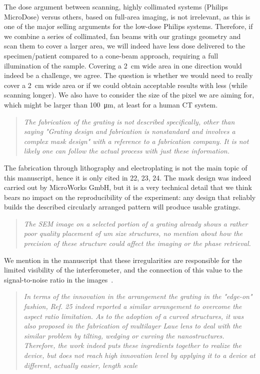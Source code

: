 \documentclass[a4paper,english]{scrartcl}
\newenvironment{reviewerquote}{\begin{quote}\itshape}{\end{quote}}
\begin{document}
The dose argument between scanning, highly collimated systems
(Philips MicroDose) versus others, based on full-area imaging, is not
irrelevant, as this is one of the major selling arguments for the low-dose
Philips systems. Therefore, if we combine a series of collimated, fan beams
with our gratings geometry and scan them to cover a larger area, we will
indeed have less dose delivered to the specimen/patient compared to a
cone-beam approach, requiring a full illumination of the sample. Covering a
\SI{2}{\centi\meter} wide area in one direction would indeed be a challenge, we agree. The
question is whether we would need to really cover a \SI{2}{\centi\meter} wide area or if we
could obtain acceptable results with less (while scanning longer). We also
have to consider the size of the pixel we are aiming for, which might be
larger than \SI{100}{\micro\meter}, at least for a human CT system.

\begin{reviewerquote}
The fabrication of the grating is not described specifically,
other than saying "Grating design and fabrication is nonstandard and
involves a complex mask design" with a reference to a fabrication company.
It is not likely one can follow the actual process with just these
information. 
\end{reviewerquote}

The fabrication through lithography and electroplating is not
the main topic of this manuscript, hence it is only cited in 22, 23, 24. The
mask design was indeed carried out by MicroWorks GmbH, but it is a very technical
detail that we think bears no impact on the reproducibility of the
experiment: any design that reliably builds the described circularly
arranged pattern will produce usable gratings.

\begin{reviewerquote}
The SEM image on a selected portion of a grating already shows a
rather poor quality placement of um size structures, no mention about how
the precision of these structure could affect the imaging or the phase
retrieval.
\end{reviewerquote}

We mention in the manuscript that these irregularities are
responsible for the limited visibility of the interferometer, and the
connection of this value to the signal-to-noise ratio in the
images~\cite{Raupach2011}.

\begin{reviewerquote}
In terms of the innovation in the arrangement the grating in the
"edge-on" fashion, Ref. 25 indeed reported a similar arrangement to overcome
the aspect ratio limitation. As to the adoption of a curved structures, it
was also proposed in the fabrication of multilayer Laue lens to deal with
the similar problem by tilting, wedging or curving the nanostructures.
Therefore, the work indeed puts these ingredients together to realize the
device, but does not reach high innovation level by applying it to a device
at different, actually easier, length scale
\end{reviewerquote}
\end{document}
